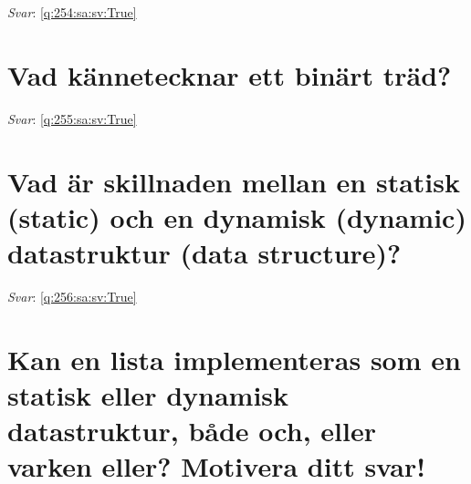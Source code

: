 \documentclass[a4paper,11pt,oneside]{book}
\begin{document}
\begin{sloppypar}
\label{q:254:sa:sv:False}

\vspace{2cm}

\noindent\makebox[\textwidth]{\hrulefill}

\vspace{1cm}

\textit{Svar}: \autoref{q:254:sa:sv:True}



\section{Vad k\"annetecknar ett bin\"art tr\"ad?}

\label{q:255:sa:sv:False}

\vspace{2cm}

\noindent\makebox[\textwidth]{\hrulefill}

\vspace{1cm}

\textit{Svar}: \autoref{q:255:sa:sv:True}



\section{Vad \"ar skillnaden mellan en statisk (static) och en dynamisk (dynamic) datastruktur (data structure)?}

\label{q:256:sa:sv:False}

\vspace{2cm}

\noindent\makebox[\textwidth]{\hrulefill}

\vspace{1cm}

\textit{Svar}: \autoref{q:256:sa:sv:True}



\section{Kan en lista implementeras som en statisk eller dynamisk datastruktur, b\r{a}de och, eller varken eller? Motivera ditt svar!}

\label{q:257:sa:sv:False}

\vspace{2cm}

\noindent\makebox[\textwidth]{\hrulefill}

\vspace{1cm}


\end{sloppypar}
\end{document}
